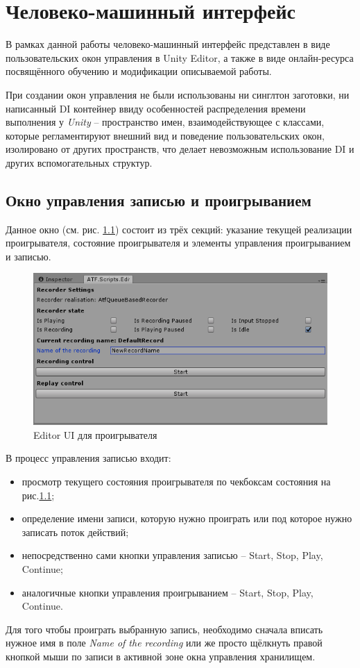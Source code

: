 \chapter{Человеко-машинный интерфейс}

В рамках данной работы человеко-машинный интерфейс представлен в виде пользовательских окон управления в Unity Editor, а также в виде онлайн-ресурса посвящённого обучению и модификации описываемой работы.

\label{cha:ch_3}
При создании окон управления не были использованы ни синглтон заготовки, ни написанный DI контейнер ввиду особенностей распределения времени выполнения  у \textit{Unity} -- пространство имен, взаимодействующее с классами, которые регламентируют внешний вид и поведение пользовательских окон, изолировано от других пространств, что делает невозможным использование DI и других вспомогательных структур. 

\section{Окно управления записью и проигрыванием}
Данное окно (см. рис. \ref{recorderUI}) состоит из трёх секций: указание текущей реализации проигрывателя, состояние проигрывателя и элементы управления проигрыванием и записью.

\begin{figure}[h]
	\centering
	\includegraphics[width=0.7\linewidth]{recorder.PNG}
	\caption{Editor UI для проигрывателя}
	\label{recorderUI}
\end{figure}

В процесс управления записью входит:
\begin{itemize}
	\item
	просмотр текущего состояния проигрывателя по чекбоксам состояния на рис.\ref{recorderUI};
	\item
	определение имени записи, которую нужно проиграть или под которое нужно записать поток действий;
	\item
	непосредственно сами кнопки управления записью -- Start, Stop, Play, Continue;
	\item
	аналогичные кнопки управления проигрыванием -- Start, Stop, Play, Continue.
\end{itemize}
Для того чтобы проиграть выбранную запись, необходимо сначала вписать нужное имя в поле \textit{Name of the recording} или же просто щёлкнуть правой кнопкой мыши по записи в активной зоне окна управления хранилищем.

